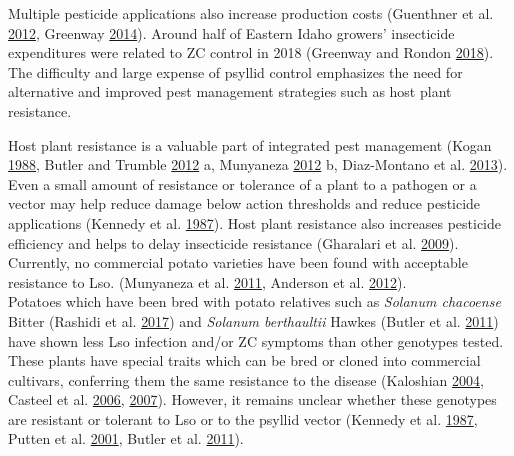 \documentclass[]{article}
\begin{document}
Multiple pesticide applications also increase production costs
(Guenthner et al. \protect\hyperlink{ref-Guenthner2012}{2012}, Greenway
\protect\hyperlink{ref-Greenway2014}{2014}). Around half of Eastern
Idaho growers' insecticide expenditures were related to ZC control in
2018 (Greenway and Rondon \protect\hyperlink{ref-Greenway2018}{2018}).
The difficulty and large expense of psyllid control emphasizes the need
for alternative and improved pest management strategies such as host
plant resistance.

Host plant resistance is a valuable part of integrated pest management
(Kogan \protect\hyperlink{ref-Kogan1988}{1988}, Butler and Trumble
\protect\hyperlink{ref-Butler2012a}{2012} a, Munyaneza
\protect\hyperlink{ref-Munyaneza2012b}{2012} b, Diaz-Montano et al.
\protect\hyperlink{ref-Diaz-Montano2013}{2013}). Even a small amount of
resistance or tolerance of a plant to a pathogen or a vector may help
reduce damage below action thresholds and reduce pesticide applications
(Kennedy et al. \protect\hyperlink{ref-Kennedy1987}{1987}). Host plant
resistance also increases pesticide efficiency and helps to delay
insecticide resistance (Gharalari et al.
\protect\hyperlink{ref-Gharalari2009}{2009}). Currently, no commercial
potato varieties have been found with acceptable resistance to Lso.
(Munyaneza et al. \protect\hyperlink{ref-Munyaneza2011}{2011}, Anderson
et al. \protect\hyperlink{ref-Anderson2012}{2012}).\\
Potatoes which have been bred with potato relatives such as
\emph{Solanum chacoense} Bitter (Rashidi et al.
\protect\hyperlink{ref-Rashidi2017}{2017}) and \emph{Solanum
berthaultii} Hawkes (Butler et al.
\protect\hyperlink{ref-Butler2011}{2011}) have shown less Lso infection
and/or ZC symptoms than other genotypes tested. These plants have
special traits which can be bred or cloned into commercial cultivars,
conferring them the same resistance to the disease (Kaloshian
\protect\hyperlink{ref-Kaloshian2004}{2004}, Casteel et al.
\protect\hyperlink{ref-Casteel2006}{2006},
\protect\hyperlink{ref-Casteel2007}{2007}). However, it remains unclear
whether these genotypes are resistant or tolerant to Lso or to the
psyllid vector (Kennedy et al.
\protect\hyperlink{ref-Kennedy1987}{1987}, Putten et al.
\protect\hyperlink{ref-Putten2001}{2001}, Butler et al.
\protect\hyperlink{ref-Butler2011}{2011}).
\end{document}
